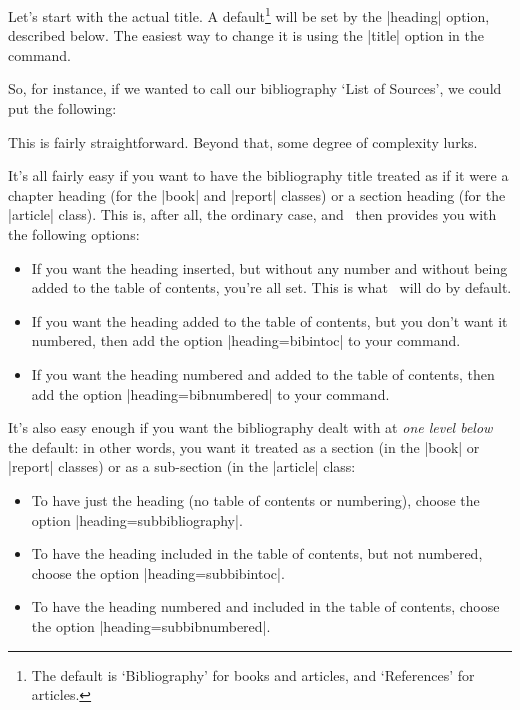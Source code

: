  Let's start with the actual title. A
default\footnote{The default is `Bibliography' for books and articles,
  and `References' for articles.} will be set by the |heading| option,
described below. The easiest way to change it is using the |title|
option in the  command.

So, for instance, if we wanted to call our bibliography `List of
Sources', we could put the following:
\begin{center}
\end{center}

This is fairly straightforward. Beyond that, some degree of complexity
lurks.

It's all fairly easy if you want to have the bibliography title
treated as if it were a chapter heading (for the |book| and |report|
classes) or a section heading (for the |article| class). This is,
after all, the ordinary case, and \biblatex\ then provides you with
the following options:
\begin{itemize}
\item If you want the heading inserted, but without any
  number and without being added to the table of contents, you're all
  set. This is what \biblatex\ will do by default.
\item If you want the heading added to the table of contents,
  but you don't want it numbered, then add the option
  |heading=bibintoc| to your  command.
\item If you want the heading numbered and added to the table
  of contents, then add the option |heading=bibnumbered| to your
   command.
\end{itemize}

It's also easy enough if you want the bibliography dealt with at
\emph{one level below} the default: in other words, you want it
treated as a section (in the |book| or |report| classes) or
as a sub-section (in the |article| class:
\begin{itemize}
\item To have just the heading (no table of contents or numbering),
  choose the option |heading=subbibliography|.
\item To have the heading included in the table of contents, but not
  numbered, choose the option |heading=subbibintoc|.
\item To have the heading numbered and included in the table of
  contents, choose the option |heading=subbibnumbered|.
\end{itemize}

